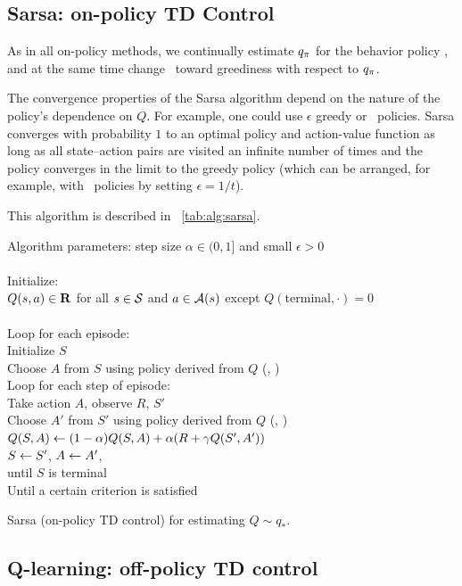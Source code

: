 \subsection{Sarsa: on-policy TD Control}

As in all on-policy methods,
we continually estimate $q_{\pi}$ for the behavior policy \pol,
and at the same time change \pol\ toward greediness with respect to $q_{\pi}$.

The convergence properties of the Sarsa algorithm depend on the nature of the policy’s dependence on $Q$.
For example, one could use $\epsilon$ greedy or \epssoft\ policies.
Sarsa converges with probability $1$ to an optimal policy and action-value function
as long as all state–action pairs are visited an infinite number of times
and the policy converges in the limit to the greedy policy
(which can be arranged, for example, with \epsgreedy\ policies by setting $\epsilon = 1 /t$).

This algorithm is described in \tablename~\ref{tab:alg:sarsa}.


\begin{table}
\beginalg
Algorithm parameters: step size $\alpha \in (0, 1]$ and small $\epsilon>0$\\
\\
Initialize:\\
\> $Q(s,a) \in \mathbf{R}$ for all $s\in\mathcal{S}$ and $a\in\mathcal{A}(s)$
    except $Q(\mathrm{terminal}, \cdot)=0$\\
\\
Loop for each episode:\\
\> Initialize $S$\\
\> Choose $A$ from $S$ using policy derived from $Q$ (\eg, \epsgreedy)\\
\> Loop for each step of episode:\\
\> \> Take action $A$, observe $R$, $S'$\\
\> \> Choose $A'$ from $S'$ using policy derived from $Q$ (\eg, \epsgreedy)\\
\> \> $Q(S,A) \leftarrow (1-\alpha) Q(S,A) + \alpha (R + \gamma Q(S',A'))$\\
\> \> $S \leftarrow S'$, $A \leftarrow A'$,\\
\> until $S$ is terminal\\
Until a certain criterion is satisfied
\endalg
\caption{Sarsa (on-policy TD control) for estimating $Q\sim q_\ast$.}
\label{tab:alg:sarsa}
\end{table}


\subsection{Q-learning: off-policy TD control}

